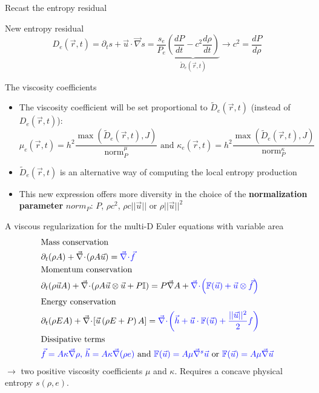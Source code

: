 \documentclass[xcolor=dvipsnames,10pt]{beamer}
\renewcommand{\div}{\vec{\nabla}\! \cdot \!}
\newcommand{\grad}{\vec{\nabla}}
\newcommand{\norm}{\textrm{norm}}
\begin{document}
\begin{frame}{Recast the entropy residual}
\begin{block}{New entropy residual}
\begin{equation}
D_e(\vec{r},t) = \partial_t s + \vec{u} \cdot \grad s = \frac{s_e}{P_e} \underbrace{\left( \frac{d P}{dt} - c^2 \frac{d \rho}{dt} \right)}_{\tilde{D}_e(\vec{r},t)} \to c^2 =\frac{dP}{d \rho} \nonumber
\end{equation}
\end{block}
\begin{block}{The viscosity coefficients}
\begin{itemize}
\item The viscosity coefficient will be set proportional to $\tilde{D}_e(\vec{r},t)$ (instead of $D_e(\vec{r},t)$):
\begin{equation}
\mu_e(\vec{r},t) = h^2 \frac{\max \left( \tilde{D}_e(\vec{r},t), J \right)}{\norm_P^\mu} \text{ and }\kappa_e(\vec{r},t) = h^2 \frac{\max \left( \tilde{D}_e(\vec{r},t), J \right)}{\norm_P^\kappa} \nonumber
\end{equation}
\item $\tilde{D}_e(\vec{r},t)$ is an alternative way of computing the local entropy production
\item This new expression offers more diversity in the choice of the \textbf{normalization parameter} $norm_P$: $P$, $\rho c^2$, $\rho c ||\vec{u} ||$ or  $\rho ||\vec{u}||^2$
\end{itemize}
\end{block}
\end{frame}
\begin{frame}{A viscous regularization for the multi-D Euler equations with variable area}
\begin{align}
&\text{Mass conservation} \nonumber \\
&\partial_t ( \rho A ) + \div \left( \rho A \vec{u} \right) = \textcolor{blue}{\div \vec{f}} \nonumber \\
&\text{Momentum conservation} \nonumber \\
&\partial_t ( \rho \vec{u} A ) + \div \left( \rho A \vec{u} \otimes \vec{u} + P \mathbb{I} \right) = P \grad A + \textcolor{blue}{\div \left( \mathbb{F}(\vec{u}) + \vec{u} \otimes \vec{f} \right)} \nonumber \\
&\text{Energy conservation} \nonumber \\
&\partial_t ( \rho E A ) + \div \left[ \vec{u} \left( \rho E + P \right) A \right] = \textcolor{blue}{\div \left( \vec{h} + \vec{u}\cdot \mathbb{F}(\vec{u}) + \frac{|| \vec{u} ||^2}{2} f \right)} \nonumber \\
&\text{Dissipative terms} \nonumber \\
& \textcolor{blue}{\vec{f} = A \kappa \grad \rho \text{, } \vec{h} = A \kappa \grad ( \rho e) } \nonumber
\text{ and } \textcolor{blue}{\mathbb{F}(\vec{u}) = A \mu \grad^s \vec{u}} \text{ or } \textcolor{blue}{\mathbb{F}(\vec{u}) = A \mu \grad \vec{u}}
\end{align}
$\to$ two positive viscosity coefficients $\mu$ and $\kappa$. Requires a concave physical entropy $s(\rho,e)$.
\end{frame}
\end{document}
